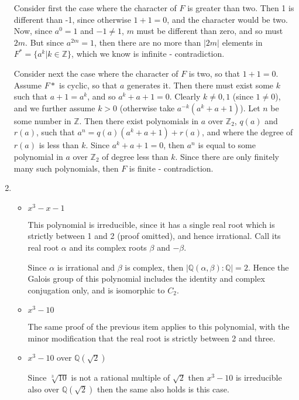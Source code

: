\documentclass[11pt]{article} \usepackage{amssymb}
\newcommand{\Q}{\mathbb Q}
\newcommand{\Z}{\mathbb Z} \newcommand{\CalE}{{\mathcal{E}}}
\begin{document}
\begin{enumerate}
    Consider first the case where the character of $F$ is greater than two. Then
    1 is different than -1, since otherwise $1+1=0$, and the character would
    be two. Now, since $a^0=1$ and $-1\neq 1$, $m$ must be different than zero, 
    and so must $2m$.
    But since $a^{2m}=1$, then there are no more than $|2m|$ elements 
    in $F^*=\{a^k | k \in \Z\}$, which we know is infinite - contradiction.
    
    Consider next the case where the character of $F$ is two, so that $1+1=0$.
    Assume $F*$ is cyclic, so that $a$ generates it. Then there must exist
    some $k$ such that $a+1=a^k$, and so $a^k+a+1=0$. 
    Clearly $k\neq 0,1$ (since $1\neq0$), 
    and we further assume $k>0$ (otherwise take $a^{-k}(a^k+a+1)$). 
    Let $n$ be some number in $\Z$. 
    Then there exist polynomials
    in $a$ over $\Z_2$, 
    $q(a)$ and $r(a)$, such that $a^n=q(a)(a^k+a+1)+r(a)$, and where
    the degree of $r(a)$ is less than $k$. Since $a^k+a+1=0$, then $a^n$ is equal
    to some polynomial in $a$ over $\Z_2$ of degree less than $k$. Since
    there are only finitely many such polynomials, then $F$ is finite - 
    contradiction.

  \item
    \begin{itemize}
    \item $x^3-x-1$

      This polynomial is irreducible, since it has a single real root which
      is strictly between 1 and 2 (proof omitted), and hence irrational. 
      Call its real root
      $\alpha$ and its complex roots $\beta$ and $-\beta$. 

      Since $\alpha$ is irrational and $\beta$ is complex, then 
      $|\Q(\alpha,\beta):\Q|=2$. Hence the Galois group of this polynomial
      includes the identity and complex conjugation only, and is isomorphic
      to $C_2$.
      
    \item $x^3-10$
      
      The same proof of the previous item applies to this polynomial, with the
      minor modification that the real root is strictly between 2 and three.

    \item $x^3-10$ over $\Q(\sqrt{2})$

      Since $\sqrt[3]{10}$ is not a rational multiple of $\sqrt{2}$ then
      $x^3-10$ is irreducible also over $\Q(\sqrt{2})$ then the same
      also holds is this case.


\end{itemize}
\end{enumerate}
\end{document}
